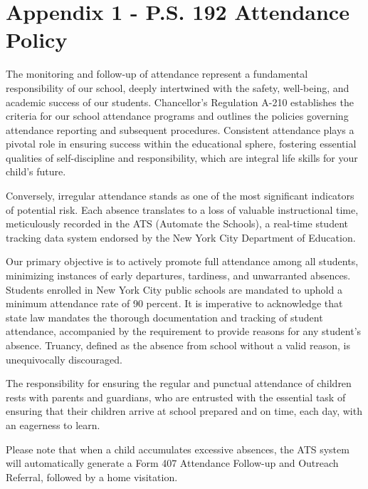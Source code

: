 \documentclass[11pt, letterpaper]{article}
\begin{document}
\newpage
\appendix
\section{Appendix 1 - P.S. 192 Attendance Policy}\label{firstappendix}
The monitoring and follow-up of attendance represent a fundamental responsibility of our school, deeply intertwined with the safety, well-being, and academic success of our students. Chancellor’s Regulation A-210 establishes the criteria for our school attendance programs and outlines the policies governing attendance reporting and subsequent procedures. Consistent attendance plays a pivotal role in ensuring success within the educational sphere, fostering essential qualities of self-discipline and responsibility, which are integral life skills for your child's future.

Conversely, irregular attendance stands as one of the most significant indicators of potential risk. Each absence translates to a loss of valuable instructional time, meticulously recorded in the ATS (Automate the Schools), a real-time student tracking data system endorsed by the New York City Department of Education.

Our primary objective is to actively promote full attendance among all students, minimizing instances of early departures, tardiness, and unwarranted absences. Students enrolled in New York City public schools are mandated to uphold a minimum attendance rate of 90 percent. It is imperative to acknowledge that state law mandates the thorough documentation and tracking of student attendance, accompanied by the requirement to provide reasons for any student's absence. Truancy, defined as the absence from school without a valid reason, is unequivocally discouraged.

The responsibility for ensuring the regular and punctual attendance of children rests with parents and guardians, who are entrusted with the essential task of ensuring that their children arrive at school prepared and on time, each day, with an eagerness to learn.

Please note that when a child accumulates excessive absences, the ATS system will automatically generate a Form 407 Attendance Follow-up and Outreach Referral, followed by a home visitation.
\end{document}
